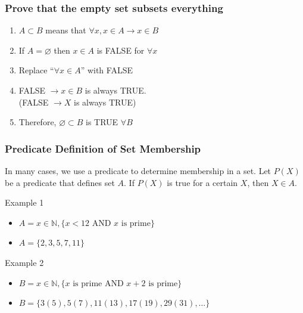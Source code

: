 \documentclass{beamer}
\begin{document}
\begin{frame}
  \frametitle{Prove that the empty set subsets everything}

  {\larger
  \begin{enumerate}
  \item $A \subset B$ means that $\forall x, x \in A \rightarrow x \in B$
    \bigskip
    
  \item If $A = \varnothing$ then $x \in A$ is FALSE for $\forall x$
    \bigskip
    
  \item Replace ``$\forall x \in A$'' with FALSE
    \bigskip
    
  \item FALSE $\rightarrow x \in B$ is always TRUE. \\(FALSE $\rightarrow X$ is always TRUE)
    \bigskip
    
  \item Therefore, $\varnothing \subset B$ is TRUE $\forall B$    
  \end{enumerate}
  }
\end{frame}

\begin{frame}
  \frametitle{Predicate Definition of Set Membership}

  In many cases, we use a predicate to determine membership in a
  set. Let $P(X)$ be a predicate that defines set $A$. If $P(X)$ is
  true for a certain $X$, then $X \in A$.

  \begin{block}{Example 1}
    \begin{itemize}
    \item $A = x \in \mathbb{N}, \{x < 12 \text{ AND } x \text{ is prime}\}$
    \item $A = \{2,3,5,7,11\}$
    \end{itemize}    
  \end{block}
  
  \begin{block}{Example 2}
    \begin{itemize}
    \item $B = x \in \mathbb{N}, \{x \text{ is prime AND } x+2 \text{ is prime}\}$
    \item $B = \{3 (5), 5 (7), 11 (13), 17 (19), 29 (31), \ldots\}$
    \end{itemize}
  \end{block}
\end{frame}
\end{document}
